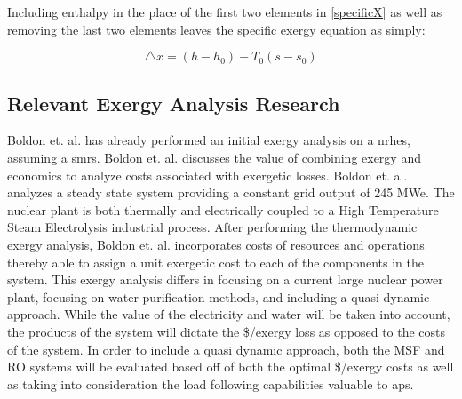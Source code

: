 \documentclass[12pt]{UIdahoMastersThesis}
\begin{document}
Including enthalpy in the place of the first two elements in \ref{specificX} as well as removing the last two elements leaves the specific exergy equation as simply:

\begin{equation}
\triangle x=(h-h_0)-T_0(s-s_0)
\end{equation}

 

\subsection{Relevant Exergy Analysis Research}
  Boldon et. al. has already performed an initial exergy analysis on a \ac{nrhes}, assuming a \ac{smrs}\cite{Boldon}. Boldon et. al. discusses the value of combining exergy and economics to analyze costs associated with exergetic losses.  Boldon et. al. analyzes a steady state system providing a constant grid output of 245 MWe.  The nuclear plant is both thermally and electrically coupled to a High Temperature Steam Electrolysis industrial process. After performing the thermodynamic exergy analysis, Boldon et. al. incorporates costs of resources and operations thereby able to assign a unit exergetic cost to each of the components in the system. This exergy analysis differs in focusing on a current large nuclear power plant, focusing on water purification methods, and including a quasi dynamic approach.  While the value of the electricity and water will be taken into account, the products of the system will dictate the \$/exergy loss as opposed to the costs of the system. In order to include a quasi dynamic approach, both the MSF and RO systems will be evaluated based off of both the optimal \$/exergy costs as well as taking into consideration the load following capabilities valuable to \ac{aps}. 
  
\end{document}
